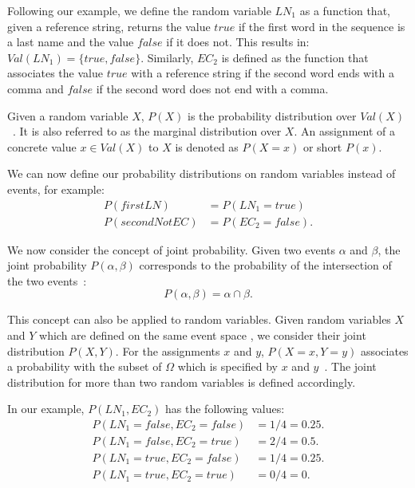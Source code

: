 Following our example, we define the \gls{random variable} $LN_1$ as a \gls{function} that, given a reference string, returns the value $\mathit{true}$ if the first word in the sequence is a last name and the value $\mathit{false}$ if it does not.
This results in: $\mathit{Val}(LN_1)=\{\mathit{true}, \mathit{false}\}$.
Similarly, $EC_2$ is defined as the function that associates the value $\mathit{true}$ with a reference string if the second word ends with a comma and $\mathit{false}$ if the second word does not end with a comma.

\bigskip

Given a \gls{random variable} $X$, $P(X)$ is the \gls{probability distribution} over $\mathit{Val}(X)$~\cite{koller2009probabilistic}.
It is also referred to as the \gls{marginal distribution} over $X$.
An \gls{assignment} of a concrete value $x\in \mathit{Val}(X)$ to $X$ is denoted as $P(X=x)$ or short $P(x)$.

We can now define our \glspl{probability distribution} on \glspl{random variable} instead of \glspl{event}, for example:
\begin{equation*}
  \begin{split}
    P(\mathit{firstLN})&= P(LN_1{=}\mathit{true})\\
    P(\mathit{secondNotEC})&= P(EC_2{=}\mathit{false}).
  \end{split}
\end{equation*}

\bigskip

We now consider the concept of \gls{joint probability}.
Given two \glspl{event} $\alpha$ and $\beta$, the \gls{joint probability} $P(\alpha,\beta)$ corresponds to the probability of the intersection of the two events~\citep{teschl2007mathematik}:
\begin{equation*}
  P(\alpha,\beta)=\alpha\cap\beta.
\end{equation*}

This concept can also be applied to \glspl{random variable}.
Given \glspl{random variable} $X$ and $Y$ which are defined on the same \gls{event space} , we consider their \gls{joint distribution} $P(X,Y)$.
For the \glspl{assignment} $x$ and $y$, $P(X{=}x,Y{=}y)$ associates a probability with the subset of $\Omega$ which is specified by  $x$ and $y$~\citep{koller2009probabilistic}.
The \gls{joint distribution} for more than two \glspl{random variable} is defined accordingly.

In our example, $P(LN_1,EC_2)$ has the following values:
\begin{equation*}
  \begin{split}
    P(LN_1{=}\mathit{false},EC_2{=}\mathit{false})&=1/4=0.25.\\
    P(LN_1{=}\mathit{false},EC_2{=}\mathit{true})&=2/4=0.5.\\
    P(LN_1{=}\mathit{true},EC_2{=}\mathit{false})&=1/4=0.25.\\
    P(LN_1{=}\mathit{true},EC_2{=}\mathit{true})&=0/4=0.
  \end{split}
\end{equation*}

